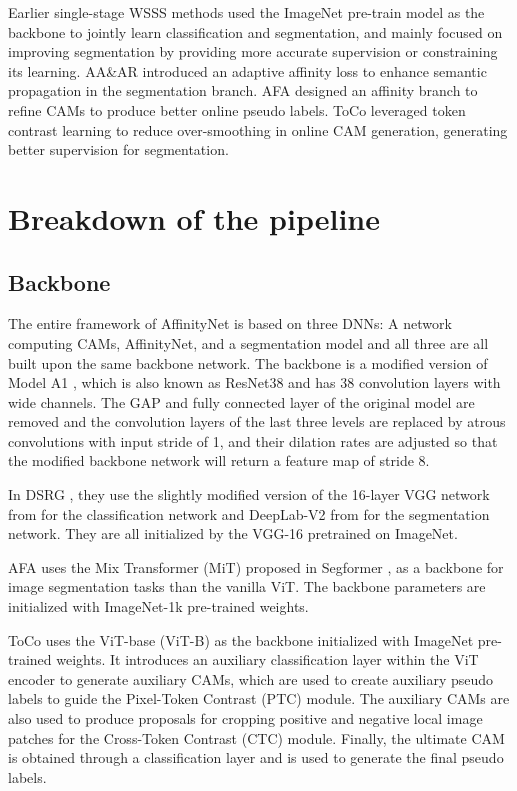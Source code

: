 Earlier single-stage WSSS methods used the ImageNet \cite{dataset_imagenet} pre-train model as the backbone to  jointly learn classification and segmentation, and mainly focused on improving segmentation by providing more accurate supervision or constraining its learning.  AA\&AR \cite{wsss_aaar} introduced an adaptive affinity loss to enhance semantic propagation in the segmentation branch. AFA \cite{wsss_afa_affinity_from_attention} designed an affinity branch to refine CAMs to produce better online pseudo labels. ToCo \cite{wsss_toco_token_contrast} leveraged token contrast learning to reduce over-smoothing in online CAM generation, generating better supervision for segmentation.


\section{Breakdown of the pipeline}
\label{sec:pipeline-breakdown}
\subsection{Backbone}
\label{subsec:backbone}

The entire framework of AffinityNet \cite{wsss_affinitynet} is based on three DNNs: A network computing CAMs, AffinityNet, and a segmentation model and all three are all built upon the same backbone network. The backbone is a modified version of Model A1 \cite{RevisitingResNET}, which is also known as ResNet38 and has 38 convolution layers with wide channels. The GAP and fully connected layer of the original model are removed and the convolution layers of the last three levels are replaced by atrous convolutions with input stride of 1, and their dilation rates are adjusted so that the modified backbone network will return a feature map of stride 8.

In DSRG \cite{wsss_dsrg_deep_seeded_region_growing}, they use the slightly modified version of the 16-layer VGG network from \cite{VGG16} for the classification network and DeepLab-V2 from \cite{fsss_deeplabv2} for the segmentation network. They are all initialized by the VGG-16 pretrained on ImageNet.

AFA \cite{wsss_afa_affinity_from_attention} uses the Mix Transformer (MiT) proposed in Segformer \cite{fsss_segformer}, as a backbone for image segmentation tasks than the vanilla ViT. The backbone parameters are initialized with ImageNet-1k pre-trained weights.

ToCo \cite{wsss_toco_token_contrast} uses the ViT-base (ViT-B) as the backbone initialized with ImageNet pre-trained weights. It  introduces an auxiliary classification layer within the ViT encoder to generate auxiliary CAMs, which are used to create auxiliary pseudo labels to guide the Pixel-Token Contrast (PTC) module. The auxiliary CAMs are also used to produce proposals for cropping positive and negative local image patches for the Cross-Token Contrast (CTC) module. Finally, the ultimate CAM is obtained through a classification layer and is used to generate the final pseudo labels.

